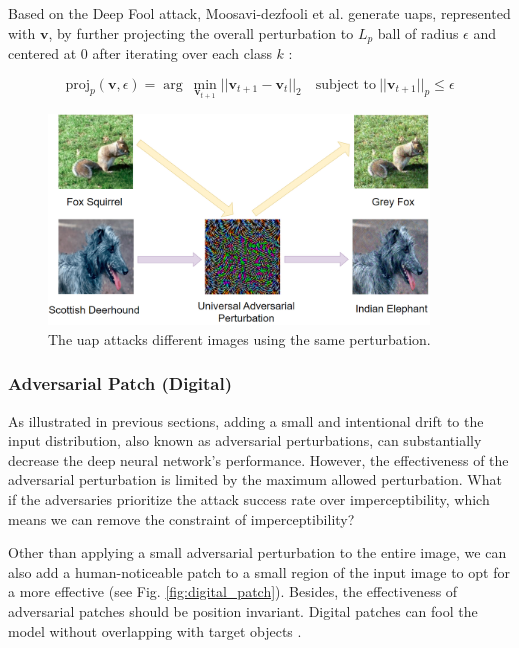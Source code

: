 Based on the Deep Fool attack, Moosavi-dezfooli et al. generate \acrshort{uap}s, represented with $\textbf{v}$, by further projecting the overall perturbation to $L_p$ ball of radius $\epsilon$ and centered at 0 after iterating over each class $k$ \citep{moosavidezfooli2017universal}:

\begin{equation}
\text{proj}_p(\textbf{v}, \epsilon)= \arg\ \underset{\textbf{v}_{t+1}}{\min}||\textbf{v}_{t+1} - \textbf{v}_{t}||_2 \quad \text{subject to}\ ||\textbf{v}_{t+1}||_p\leq\epsilon
\end{equation}

\begin{figure}[H]
\centering
\includegraphics[width=0.9\textwidth]{figures/chapter_intro/uap.png}
\caption{The \acrfull{uap} attacks different images using the same perturbation.}
\label{fig.uap}
\end{figure}


\subsubsection{Adversarial Patch (Digital)}

As illustrated in previous sections, adding a small and intentional drift to the input distribution, also known as adversarial perturbations, can substantially decrease the deep neural network's performance. However, the effectiveness of the adversarial perturbation is limited by the maximum allowed perturbation. What if the adversaries prioritize the attack success rate over imperceptibility, which means we can remove the constraint of imperceptibility?

Other than applying a small adversarial perturbation to the entire image, we can also add a human-noticeable patch to a small region of the input image to opt for a more effective (see Fig. \ref{fig:digital_patch}). Besides, the effectiveness of adversarial patches should be position invariant. Digital patches can fool the model without overlapping with target objects \citep{saha2019adversarial}.


